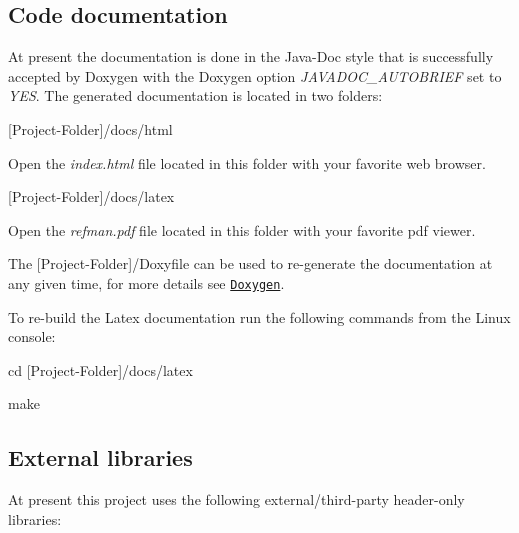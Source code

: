\subsection*{Code documentation}

At present the documentation is done in the Java-\/\+Doc style that is successfully accepted by Doxygen with the Doxygen option {\itshape J\+A\+V\+A\+D\+O\+C\+\_\+\+A\+U\+T\+O\+B\+R\+I\+E\+F} set to {\itshape Y\+E\+S}. The generated documentation is located in two folders\+:


\begin{DoxyItemize}
\item {\ttfamily \mbox{[}Project-\/\+Folder\mbox{]}/docs/html}
\begin{DoxyItemize}
\item Open the {\itshape index.\+html} file located in this folder with your favorite web browser.
\end{DoxyItemize}
\item {\ttfamily \mbox{[}Project-\/\+Folder\mbox{]}/docs/latex}
\begin{DoxyItemize}
\item Open the {\itshape refman.\+pdf} file located in this folder with your favorite pdf viewer.
\end{DoxyItemize}
\end{DoxyItemize}

The {\ttfamily \mbox{[}Project-\/\+Folder\mbox{]}/\+Doxyfile} can be used to re-\/generate the documentation at any given time, for more details see \href{www.doxygen.org/}{\tt Doxygen}.


\begin{DoxyItemize}
\item To re-\/build the Latex documentation run the following commands from the Linux console\+:
\begin{DoxyItemize}
\item {\ttfamily cd \mbox{[}Project-\/\+Folder\mbox{]}/docs/latex}
\item {\ttfamily make}
\end{DoxyItemize}
\end{DoxyItemize}

\subsection*{External libraries}

At present this project uses the following external/third-\/party header-\/only libraries\+:

